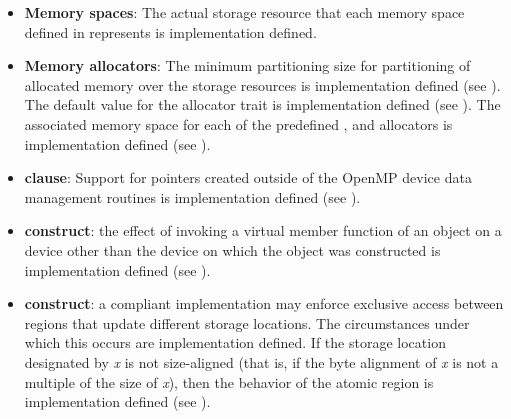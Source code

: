 \begin{itemize}
\item \textbf{Memory spaces}: The actual storage resource that each memory 
      space defined in  represents is 
      implementation defined.
\item \textbf{Memory allocators}: The minimum partitioning size for partitioning 
      of allocated memory over the storage resources is implementation defined 
      (see ). The default value for the 
       allocator trait is implementation defined (see 
      ). The associated memory space for each of 
      the predefined ,  
      and  allocators is implementation defined 
      (see ).
\item {} \textbf{clause}: Support for pointers created outside 
      of the OpenMP device data management routines is implementation defined 
      (see ).
\item {} \textbf{construct}: the effect of invoking a virtual member
      function of an object on a device other than the device on which the object 
      was constructed is implementation defined (see 
      ).
\item {} \textbf{construct}: a compliant implementation may enforce 
      exclusive access 
      between  regions that update different storage locations. 
      The circumstances under which this occurs are implementation defined. 
      If the storage location designated by \emph{x} is not size-aligned (that 
      is, if the byte alignment of \emph{x} is not a multiple of the size of 
      \emph{x}), then the behavior of the atomic region is implementation 
      defined (see ).


\end{itemize}
